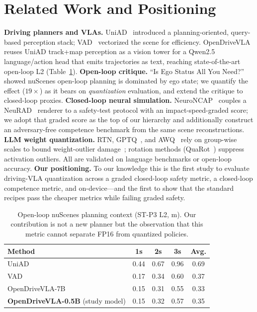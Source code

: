 \documentclass[conference]{IEEEtran}
\begin{document}
\section{Related Work and Positioning}
\textbf{Driving planners and VLAs.} UniAD~\cite{uniad} introduced a planning-oriented,
query-based perception stack; VAD~\cite{vad} vectorized the scene for efficiency.
OpenDriveVLA~\cite{opendrivevla} reuses UniAD track+map perception as a vision tower for a
Qwen2.5 language/action head that emits trajectories as text, reaching state-of-the-art
open-loop L2 (Table~\ref{tab:planners}).
\textbf{Open-loop critique.} ``Is Ego Status All You Need?''~\cite{egostatus} showed nuScenes
open-loop planning is dominated by ego state; we quantify the effect ($19\times$) as it bears
on \emph{quantization} evaluation, and extend the critique to closed-loop proxies.
\textbf{Closed-loop neural simulation.} NeuroNCAP~\cite{neuroncap} couples a
NeuRAD~\cite{neurad} renderer to a safety-test protocol with an impact-speed-graded score;
we adopt that graded score as the top of our hierarchy and additionally construct an
adversary-free competence benchmark from the same scene reconstructions.
\textbf{LLM weight quantization.} RTN, GPTQ~\cite{gptq}, and AWQ~\cite{awq} rely on
group-wise scales to bound weight-outlier damage~\cite{llmint8,smoothquant}; rotation methods
(QuaRot~\cite{quarot}) suppress activation outliers. All are validated on language benchmarks
or open-loop accuracy. \textbf{Our positioning.} To our knowledge this is the first study to
evaluate driving-VLA quantization across a graded closed-loop safety metric, a closed-loop
competence metric, and on-device---and the first to show that the standard recipes pass the
cheaper metrics while failing graded safety.

\begin{table}[t]\centering
\caption{Open-loop nuScenes planning context (ST-P3 L2, m). Our contribution is not a new
planner but the observation that this metric cannot separate FP16 from quantized policies.}
\label{tab:planners}
\begin{tabular}{lcccc}
\toprule
Method & 1s & 2s & 3s & Avg. \\
\midrule
UniAD~\cite{uniad}            & 0.44 & 0.67 & 0.96 & 0.69 \\
VAD~\cite{vad}                & 0.17 & 0.34 & 0.60 & 0.37 \\
OpenDriveVLA-7B~\cite{opendrivevla}  & 0.15 & 0.31 & 0.55 & 0.33 \\
\textbf{OpenDriveVLA-0.5B} (study model) & 0.15 & 0.32 & 0.57 & 0.35 \\
\bottomrule
\end{tabular}
\end{table}
\end{document}
